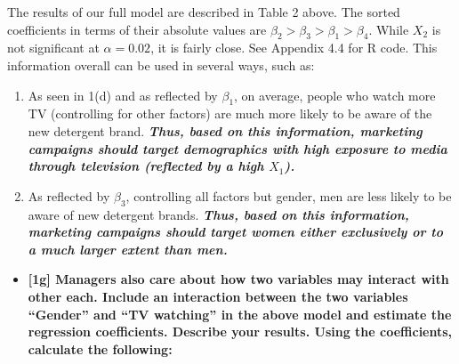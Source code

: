 \documentclass[10pt, oneside,spanish]{article}
\begin{document}


The results of our full model are described in Table 2 above. The sorted coefficients in terms of their absolute values are $\beta_2  > \beta_3 > \beta_1 > \beta_4 $. While $X_2$ is not significant at $ \alpha = 0.02$, it is fairly close. See Appendix 4.4 for R code. This information overall can be used in several ways, such as:

\begin{enumerate}
\item As seen in 1(d) and as reflected by $\beta_1$, on average, people who watch more TV (controlling for other factors) are much more likely to be aware of the new detergent brand. \textit{\textbf{Thus, based on this information, marketing campaigns should target demographics with high exposure to media through television (reflected by a high $X_1$).  }}
\item As reflected by $\beta_3$, controlling all factors but gender,  men are less likely to be aware of new detergent brands. \textit{\textbf{Thus, based on this information, marketing campaigns should target women either exclusively or to a much larger extent than men. }}
\end{enumerate}


\pagebreak

\begin{itemize}
\item \textbf{[1g] Managers also care about how two variables may interact with other each. Include an interaction between the two variables “Gender” and “TV watching” in the above model and estimate the regression coefficients. Describe your results. Using the coefficients, calculate the following:}
\end{itemize}
\end{document}
